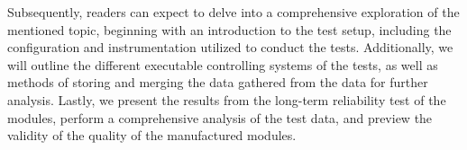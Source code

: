 Subsequently, readers can expect to delve into a comprehensive exploration of the mentioned topic, beginning with an introduction to the test setup, including the configuration and instrumentation utilized to conduct the tests. Additionally, we will outline the different executable controlling systems of the tests, as well as methods of storing and merging the data gathered from the data for further analysis. Lastly, we present the results from the long-term reliability test of the modules, perform a comprehensive analysis of the test data, and preview the validity of the quality of the manufactured modules. 
